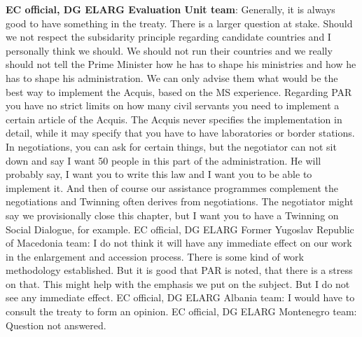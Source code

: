 \textbf{EC official, DG ELARG Evaluation Unit team}: Generally, it is always good to have something in the treaty. There is a larger question at stake. Should we not respect the subsidarity principle regarding candidate countries and I personally think we should. We should not run their countries and we really should not tell the Prime Minister how he has to shape his ministries and how he has to shape his administration. We can only advise them what would be the best way to implement the Acquis, based on the MS experience. Regarding PAR you have no strict limits on how many civil servants you need to implement a certain article of the Acquis. The Acquis never specifies the implementation in detail, while it may specify that you have to have laboratories or border stations. In negotiations, you can ask for certain things, but the negotiator can not sit down and say I want 50 people in this part of the administration. He will probably say, I want you to write this law and I want you to be able to implement it. And then of course our assistance programmes complement the negotiations and Twinning often derives from negotiations. The negotiator might say we provisionally close this chapter, but I want you to have a Twinning on Social Dialogue, for example.
EC official, DG ELARG Former Yugoslav Republic of Macedonia team: I do not think it will have any immediate effect on our work in the enlargement and accession process. There is some kind of work methodology established. But it is good that PAR is noted, that there is a stress on that. This might help with the emphasis we put on the subject. But I do not see any immediate effect. 
EC official, DG ELARG Albania team: I would have to consult the treaty to form an opinion. 
EC official, DG ELARG Montenegro team: Question not answered.\\
